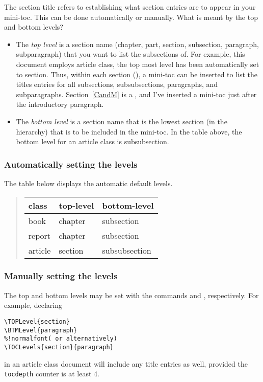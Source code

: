 \documentclass[10pt]{article}
\edef\amtIndent{\the\parindent}
\begin{document}
The section title refers to establishing what section entries are to appear in your mini-toc. This can be done
automatically or manually. What is meant by the top and bottom levels?
\begin{itemize}
   \item The \emph{top level} is a section name (chapter, part, section,
       subsection, paragraph, subparagraph) that you want to list the
       subsections of. For example, this document employs article
       class, the top most level has been automatically set to section.
       Thus, within each section (), a mini-toc can be inserted to list the
       titles entries for all subsections, subsubsections, paragraphs, and subparagraphs.
       Section~\ref{CandM} is a , and I've inserted a mini-toc just
       after the introductory paragraph.
   \item The \emph{bottom level} is a section name that is the lowest
       section (in the hierarchy) that is to be included in the mini-toc.
       In the table above, the bottom level for an article class
       is subsubsection.
\end{itemize}

\subsubsection{Automatically setting the levels}

The table below displays the automatic default levels.
\begin{quote}
\begin{tabular}{lll}
\bfseries class & \bfseries top-level & \bfseries bottom-level\\\hline
book    & chapter   & subsection\\
report  & chapter   & subsection\\
article & section   & subsubsection
\end{tabular}
\end{quote}

\subsubsection{Manually setting the levels}

The top and bottom levels may be set with the commands  and
, respectively. For example, declaring
\begin{Verbatim}[xleftmargin=\amtIndent,commandchars=!()]
\TOPLevel{section}
\BTMLevel{paragraph}
%!normalfont( or alternatively)
\TOCLevels{section}{paragraph}
\end{Verbatim}
in an article class document will include any  title entries as well, provided
the \texttt{tocdepth} counter is at least 4.
\end{document}
